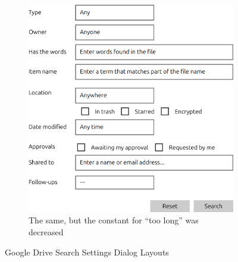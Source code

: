 \begin{figure}[t]
\begin{subfigure}[t]{.45\textwidth}
    \end{subfigure}\hspace{1cm}
    \begin{subfigure}[t]{.45\textwidth}
      \centering
      \includegraphics[scale=0.25]{google-drive-search-setting-output3.png}
      \caption{The same, but the constant for ``too long'' was decreased}
    \end{subfigure}
    \caption{Google Drive Search Settings Dialog Layouts}
    \label{fig:QMLtwoGuidelines}
\end{figure}


